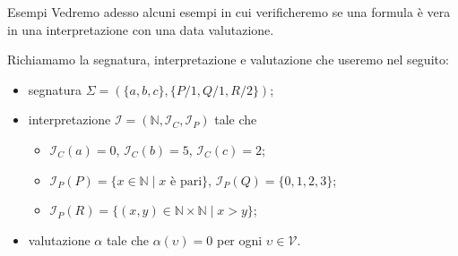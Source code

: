 \documentclass[aspectratio=169,10pt,dvipsnames,xcolor=table,handout]{beamer}
\newcommand{\mcI}{\mathcal{I}}
\newcommand{\mc}{\mathcal}
\begin{document}
\begin{frame}{Esempi}
    Vedremo adesso alcuni esempi in cui verificheremo se una formula è vera in una interpretazione con una data valutazione.

    \medskip Richiamamo la segnatura, interpretazione e valutazione che useremo nel seguito:
    \begin{itemize}
        \item segnatura $\Sigma=(\{a, b, c\}, \{P/1, Q/1, R/2\})$;
        \item interpretazione $\mcI = (\mathbb N, \mcI_C, \mcI_P)$ tale che
        \begin{itemize}
            \item $\mc I_C(a) = 0$, $\mc I_C(b) = 5$, $\mc I_C(c) = 2$;
            \item $\mc I_P(P) = \{ x \in \mathbb N \mid \text{$x$ è pari} \}$, \quad $\mc I_P(Q) = \{ 0, 1, 2, 3 \}$;
            \item $\mc I_P(R) = \{ (x,y) \in \mathbb N \times \mathbb N \mid x > y \}$;
        \end{itemize}
        \item valutazione $\alpha$ tale che $\alpha(\upsilon) = 0$ per ogni $\upsilon \in \mc V$.
    \end{itemize}
\end{frame}
\end{document}
